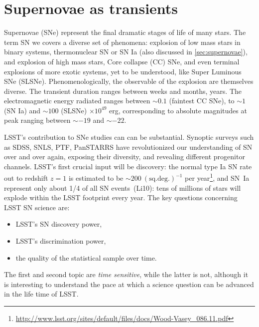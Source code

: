 %
%
%
%
%
%
%
%

\section{Supernovae as transients}
\def\secname{SNtransients}\label{sec:\secname} %


Supernovae (SNe) represent the final dramatic stages of life of many
stars. The term SN we covers a diverse set of phenomena: explosion of
low mass stars in binary systems, thermonuclear SN or SN Ia (also
discussed in \ref{sec:supernovae}), and explosion of high mass stars,
Core collapse (CC) SNe, and even terminal explosions of more exotic
systems, yet to be understood, like Super Luminous SNe
(SLSNe). Phenomenologically, the observable of the explosion are
themselves diverse. The transient duration ranges between weeks and
months, years. The electromagnetic energy radiated ranges between
$\sim0.1$ (faintest CC SNe), to $\sim1$ (SN Ia) and $\sim100$ (SLSNe)
$\times 10^{49}$ erg, corresponding to absolute magnitudes at peak
ranging between $\sim-19$ and $\sim-22$.

LSST's contribution to SNe studies can can be substantial. Synoptic
surveys such as SDSS, SNLS, PTF, PanSTARRS have revolutionized our
understanding of SN over and over again, exposing their diversity,
and revealing different progenitor channels. LSST's first crucial
input will be discovery: the normal type Ia SN rate out to redshift
$z=1$ is estimated to be $\sim200 ~(\mathrm{sq. deg.})^{-1}$ per
year\footnote{\url{http://www.lsst.org/sites/default/files/docs/Wood-Vasey_086.11.pdf}},
and SN~Ia represent only about 1/4 of all SN
events~(Li10): tens of millions of stars will explode
within the LSST footprint every year. The key questions concerning
LSST SN science are:
\begin{itemize}
\item
LSST's SN discovery power,
\item
LSST's discrimination power,
\item
the quality of the statistical sample over time.
\end{itemize}
The first and second topic are \emph{time sensitive}, while the latter
is not, although it is interesting to understand the pace at which a
science question can be advanced in the life time of LSST.

